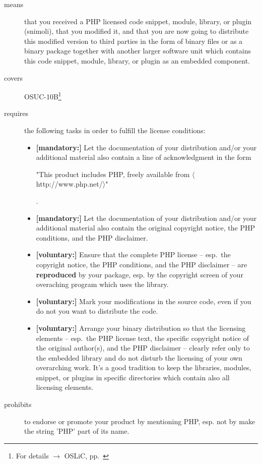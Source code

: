 \begin{description}
\item[means] that you received a PHP licensed code snippet, module, library,
  or plugin (snimoli), that you modified it, and that you are now going to
  distribute this modified version to third parties in the form of binary files
  or as a binary package together with another larger software unit which
  contains this code snippet, module, library, or plugin as an embedded component.

\item[covers] OSUC-10B\footnote{For details $\rightarrow$ OSLiC, pp.\
\pageref{OSUC-10B-DEF}}
\item[requires] the following tasks in order to fulfill the license conditions:
\begin{itemize}

  \item \textbf{[mandatory:]} Let the documentation of your distribution and/or
  your additional material also contain a line of acknowledgment in the form
  \begin{footnotesize}"This product includes PHP, freely available from
  $\langle$http://www.php.net/$\rangle$"\end{footnotesize}.
    
  \item \textbf{[mandatory:]} Let the documentation of your distribution and/or
  your additional material also contain the original copyright notice, the PHP
  conditions, and the PHP disclaimer.

  \item \textbf{[voluntary:]} Ensure that the complete PHP license -- esp.\ the
  copyright notice, the PHP conditions, and the PHP disclaimer -- are
  \textbf{reproduced} by your package, esp. by the copyright screen of your
  overaching program which uses the library.
    
  \item \textbf{[voluntary:]} Mark your modifications in the source code,
  even if you do not you want to distribute the code.
  
  \item \textbf{[voluntary:]} Arrange your binary distribution so that the
  licensing elements -- esp.\ the PHP license text, the specific copyright
  notice of the original author(s), and the PHP disclaimer -- clearly refer
  only to the embedded library and do not disturb the licensing of your own
  overarching work. It's a good tradition to keep the libraries, modules,
  snippet, or plugins in specific directories which contain also all licensing
  elements.
\end{itemize}

\item[prohibits] to endorse or promote your product by mentioning PHP, esp. not
by make the string 'PHP' part of its name.

\end{description}

